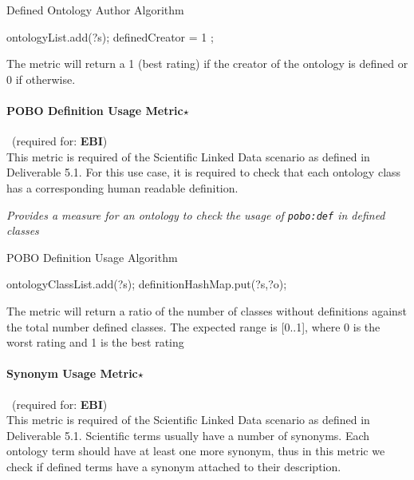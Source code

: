 \begin{algorithm}
\caption{Defined Ontology Author Algorithm}
\begin{algorithmic}[1]
 ontologyList.add(?s); \EndIf
{} definedCreator = 1 ; \EndIf
\EndProcedure
\end{algorithmic}
\end{algorithm}

The metric will return a 1 (best rating) if the creator of the ontology is defined or 0 if otherwise.

\paragraph{POBO Definition Usage Metric$\star$}~(required for: \textbf{EBI})~\\ 
This metric is required of the Scientific Linked Data scenario as defined in Deliverable 5.1.
For this use case, it is required to check that each ontology class has a corresponding human readable definition.

\begin{mdframed}[style=metricdefinition]
\emph{Provides a measure for an ontology to check the usage of \texttt{pobo:def} in defined classes}
\end{mdframed}

\begin{algorithm}
\caption{POBO Definition Usage Algorithm}
\begin{algorithmic}[1]
 ontologyClassList.add(?s); \EndIf
{} 
\State definitionHashMap.put(?s,?o);
\EndIf
\EndProcedure
\end{algorithmic}
\end{algorithm}

The metric will return a ratio of the number of classes without definitions against the total number defined classes. The expected range is [0..1], where 0 is the worst rating and 1 is the best rating

\paragraph{Synonym Usage Metric$\star$}~(required for: \textbf{EBI})~\\ 
This metric is required of the Scientific Linked Data scenario as defined in Deliverable 5.1.
Scientific terms usually have a number of synonyms.
Each ontology term should have at least one more synonym, thus in this metric we check if defined terms have a synonym attached to their description.

